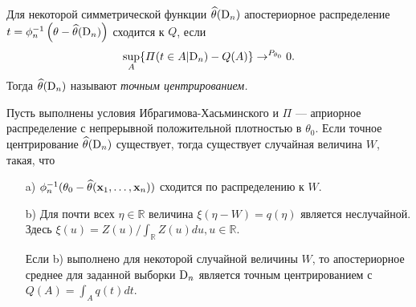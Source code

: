 \begin{Definition}
Для некоторой симметрической функции $\widehat{\theta}(\mathrm{D}_{n})$ апостериорное распределение $t = \phi_{n}^{-1} \left(\theta - \widehat{\theta}(\mathrm{D}_{n}) \right)$ сходится к $Q$, если 
\[
\sup_{A} \{\varPi(t \in A| \mathrm{D}_{n}) - Q(A)\} \rightarrow^{P_{\theta_0}} 0.
\]
Тогда $\widehat{\theta}(\mathrm{D}_{n})$ называют \emph{точным центрированием.}
\end{Definition}

\begin{Theorem}
Пусть выполнены условия Ибрагимова-Хасьминского и $\Pi$ --- априорное распределение с непрерывной положительной плотностью в $\theta_0$. 
Если точное центрирование $\widehat{\theta}(\mathrm{D}_{n})$ существует, тогда существует случайная величина $W\!$, такая, что
\begin{itemize}
\item[a)] $\phi_{n}^{-1}(\theta_0 - \widehat{\theta}(\mathbf{x}_1, \ldots, \mathbf{x}_{n}))$ сходится по распределению к $W$.
\item[b)] Для почти всех $\eta \in \mathbb{R}$ величина $\xi(\eta - W) = q(\eta)$ является неслучайной. Здесь $\xi(u) = Z(u) / \int_{\mathbb{R}} Z(u) du, u \in \mathbb{R}$.

Если b) выполнено для некоторой случайной величины $W$, то апостериорное среднее для заданной выборки $\mathrm{D}_n$ является точным центрированием с $Q(A) = \int_{A} q(t) dt$.
\end{itemize}
\end{Theorem}